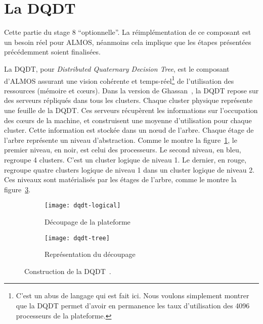   \section{La DQDT}
  \label{sec:dqdt}

    Cette partie du stage 8 ``optionnelle''. La réimplémentation de ce composant
    est un besoin réel pour ALMOS, néanmoins cela implique que les étapes
    présentées précédemment soient finalisées.

    La DQDT, pour \textit{Distributed Quaternary Decision Tree}, est le
    composant d'ALMOS assurant une vision cohérente et temps-réel\footnote{C'est
      un abus de langage qui est fait ici. Nous voulons simplement montrer que
      la DQDT permet d'avoir en permanence les taux d'utilisation des 4096
      processeurs de la plateforme.} de l'utilisation des ressources (mémoire et
    c\oe urs). Dans la version de Ghassan~\citet{almaless2014universite}, la
    DQDT repose sur des serveurs répliqués dans tous les clusters. Chaque
    cluster physique représente une feuille de la DQDT. Ces serveurs récupèrent
    les informations sur l'occupation des c\oe urs de la machine, et
    construisent une moyenne d'utilisation pour chaque cluster. Cette
    information est stockée dans un n\oe ud de l'arbre. Chaque étage de l'arbre
    représente un niveau d'abstraction. Comme le montre la
    figure~\ref{fig:dqdt-logical}, le premier niveau, en noir, est celui des
    processeurs. Le second niveau, en bleu, regroupe 4 clusters. C'est un
    cluster logique de niveau 1. Le dernier, en rouge, regroupe quatre clusters
    logique de niveau 1 dans un cluster logique de niveau 2. Ces niveaux sont
    matérialisés par les étages de l'arbre, comme le montre la
    figure~\ref{fig:dqdt-tree}.\\

    \begin{figure}[ht]
      \begin{subfigure}[b]{0.5\textwidth}
        \texttt{[image: dqdt-logical]}
        \caption{Découpage de la plateforme}
        \label{fig:dqdt-logical}
      \end{subfigure}
      \begin{subfigure}[b]{0.4\textwidth}
        \texttt{[image: dqdt-tree]}
        \caption{Représentation du découpage}
        \label{fig:dqdt-tree}
      \end{subfigure}
      \caption{Construction de la DQDT~\citep{almaless2014universite}.}
    \end{figure}


